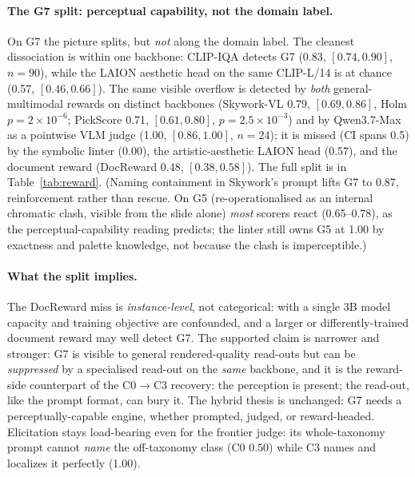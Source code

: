 \documentclass[10pt]{article}
\newcommand{\g}[1]{\textsf{#1}}        %
\begin{document}
\paragraph{The \g{G7} split: perceptual capability, not the domain label.}
On \g{G7} the picture splits, but \emph{not} along the domain label. The cleanest dissociation is within one
backbone: CLIP-IQA detects \g{G7} (0.83, $[0.74,0.90]$, $n{=}90$), while the LAION aesthetic head on the same
CLIP-L/14 is at chance (0.57, $[0.46,0.66]$). The same visible overflow is detected by \emph{both}
general-multimodal rewards on distinct backbones (Skywork-VL 0.79, $[0.69,0.86]$, Holm $p{=}2\!\times\!10^{-6}$;
PickScore 0.71, $[0.61,0.80]$, $p{=}2.5\!\times\!10^{-3}$) and by Qwen3.7-Max as a pointwise VLM judge (1.00,
$[0.86,1.00]$, $n{=}24$); it is missed (CI spans 0.5) by the symbolic linter (0.00), the artistic-aesthetic
LAION head (0.57), and the document reward (DocReward 0.48, $[0.38,0.58]$). The full split is in
Table~\ref{tab:reward}. (Naming containment in
Skywork's prompt lifts \g{G7} to 0.87, reinforcement rather than rescue. On \g{G5} (re-operationalised as an
internal chromatic clash, visible from the slide alone) \emph{most} scorers react (0.65--0.78), as the
perceptual-capability reading predicts; the linter still owns \g{G5} at 1.00 by exactness and palette
knowledge, not because the clash is imperceptible.)

\paragraph{What the split implies.}
The DocReward miss is \emph{instance-level}, not categorical: with a single 3B model capacity and training
objective are confounded, and a larger or differently-trained document reward may well detect \g{G7}. The
supported claim is narrower and stronger: \g{G7} is visible to general rendered-quality read-outs but can be
\emph{suppressed} by a specialised read-out on the \emph{same} backbone, and it is the reward-side counterpart
of the C0$\to$C3 recovery: the perception is present; the read-out, like the prompt format, can bury it. The
hybrid thesis is unchanged: \g{G7} needs a perceptually-capable engine, whether prompted, judged, or
reward-headed. Elicitation stays load-bearing even for the frontier judge: its whole-taxonomy prompt cannot
\emph{name} the off-taxonomy class (C0 $0.50$) while C3 names and localizes it perfectly (1.00).
\end{document}
